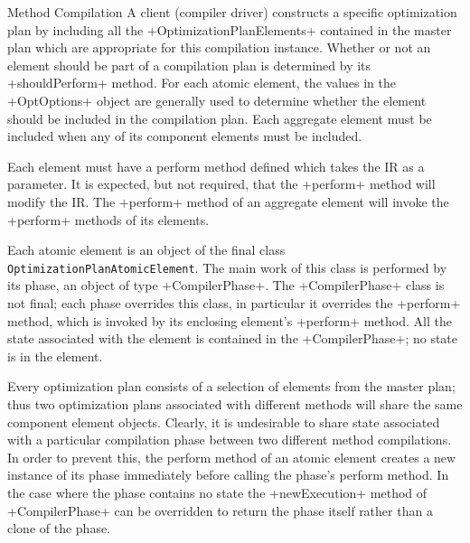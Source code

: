 \begin{section}{Method Compilation}
A client (compiler driver) constructs a specific optimization plan by including all the \spverb+OptimizationPlanElements+ contained in the master plan which are appropriate for this compilation instance. Whether or not an element should be part of a compilation plan is determined by its \spverb+shouldPerform+ method. For each atomic element, the values in the \spverb+OptOptions+ object are generally used to determine whether the element should be included in the compilation plan. Each aggregate element must be included when any of its component elements must be included.

Each element must have a perform method defined which takes the IR as a parameter. It is expected, but not required, that the \spverb+perform+ method will modify the IR. The \spverb+perform+ method of an aggregate element will invoke the \spverb+perform+ methods of its elements.

Each atomic element is an object of the final class \texttt{OptimizationPlanAtomicElement}. The main work of this class is performed by its phase, an object of type \spverb+CompilerPhase+. The \spverb+CompilerPhase+ class is not final; each phase overrides this class, in particular it overrides the \spverb+perform+ method, which is invoked by its enclosing element's \spverb+perform+ method. All the state associated with the element is contained in the \spverb+CompilerPhase+; no state is in the element.

Every optimization plan consists of a selection of elements from the master plan; thus two optimization plans associated with different methods will share the same component element objects. Clearly, it is undesirable to share state associated with a particular compilation phase between two different method compilations. In order to prevent this, the perform method of an atomic element creates a new instance of its phase immediately before calling the phase's perform method. In the case where the phase contains no state the \spverb+newExecution+ method of \spverb+CompilerPhase+ can be overridden to return the phase itself rather than a clone of the phase.

\end{section}
